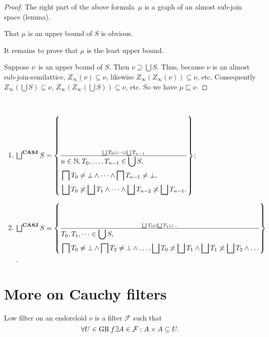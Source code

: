 \begin{proof}
The right part of the above formula~$\mu$ is a graph of an almost sub-join space (lemma).

That $\mu$ is an upper bound of $S$ is obvious.

It remains to prove that $\mu$ is the least upper bound.

Suppose $\nu$~is an upper bound of $S$. Then $\nu\supseteq\bigcup S$. Thus, because $\nu$ is an almost sub-join-semilattice,
$Z_{\infty}(\nu)\subseteq\nu$, likewise $Z_{\infty}(Z_{\infty}(\nu))\subseteq\nu$, etc. Consequently $Z_{\infty}(\bigcup S)\subseteq\nu$, $Z_{\infty}(Z_{\infty}(\bigcup S))\subseteq\nu$, etc.
So we have $\mu\sqsubseteq\nu$.
\end{proof}

\begin{conjecture}
~
\begin{enumerate}
\item $\bigsqcup^{\mathbf{CASJ}}S=
\setcond{\bigsqcup T_0\sqcup\dots\sqcup\bigsqcup T_{n-1}}{
\begin{aligned}
&n\in\mathbb{N},T_0,\dots,T_{n-1}\in\bigcup S, \\
&\bigsqcap T_0\ne\bot\land\dots\land\bigsqcap T_{n-1}\ne\bot, \\
&\bigsqcup T_0\nasymp\bigsqcup T_1\land\dots\land\bigsqcup T_{n-2}\nasymp\bigsqcup T_{n-1}.
\end{aligned}}$;

\item $\bigsqcup^{\mathbf{CASJ}}S=
\setcond{\bigsqcup T_0\sqcup \bigsqcup T_1\sqcup\dots}{
\begin{aligned}
&T_0,T_1,\dots\in\bigcup S, \\
&\bigsqcap T_0\ne\bot\land\bigsqcap T_2\ne\bot\land\dots,
\bigsqcup T_0\nasymp\bigsqcup T_1\land\bigsqcup T_1\nasymp\bigsqcup T_2\land\dots
\end{aligned}}$.
\end{enumerate}
\end{conjecture}

\section{More on Cauchy filters}

\begin{obvious}
Low filter on an endoreloid $\nu$ is a filter $\mathcal{F}$ such that
\[ \forall U \in \operatorname{GR} f \exists A \in \mathcal{F} : A \times A \subseteq
   U. \]
\end{obvious}

